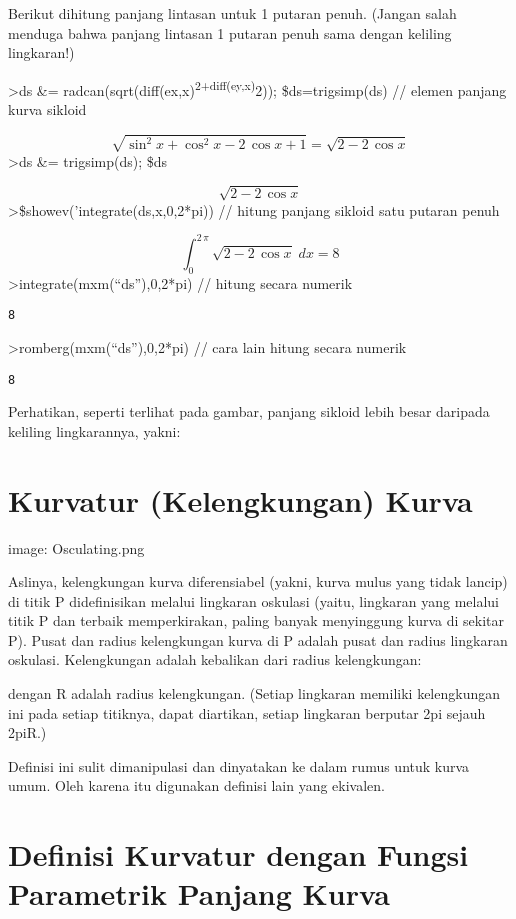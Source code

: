 \documentclass[
]{book}
\begin{document}
Berikut dihitung panjang lintasan untuk 1 putaran penuh. (Jangan salah menduga bahwa panjang lintasan 1 putaran penuh sama dengan keliling lingkaran!)

\textgreater ds \&= radcan(sqrt(diff(ex,x)\textsuperscript{2+diff(ey,x)}2)); \$ds=trigsimp(ds) // elemen panjang kurva sikloid

\[\sqrt{\sin ^2x+\cos ^2x-2\,\cos x+1}=\sqrt{2-2\,\cos x}\]\textgreater ds \&= trigsimp(ds); \$ds

\[\sqrt{2-2\,\cos x}\]\textgreater\$showev('integrate(ds,x,0,2*pi)) // hitung panjang sikloid satu putaran penuh

\[\int_{0}^{2\,\pi}{\sqrt{2-2\,\cos x}\;dx}=8\]\textgreater integrate(mxm(``ds''),0,2*pi) // hitung secara numerik

\begin{verbatim}
8
\end{verbatim}

\textgreater romberg(mxm(``ds''),0,2*pi) // cara lain hitung secara numerik

\begin{verbatim}
8
\end{verbatim}

Perhatikan, seperti terlihat pada gambar, panjang sikloid lebih besar daripada keliling lingkarannya, yakni:

\section{Kurvatur (Kelengkungan) Kurva}\label{kurvatur-kelengkungan-kurva}

image: Osculating.png

Aslinya, kelengkungan kurva diferensiabel (yakni, kurva mulus yang tidak lancip) di titik P didefinisikan melalui lingkaran oskulasi (yaitu, lingkaran yang melalui titik P dan terbaik memperkirakan, paling banyak menyinggung kurva di sekitar P). Pusat dan radius kelengkungan kurva di P adalah pusat dan radius lingkaran oskulasi. Kelengkungan adalah kebalikan dari radius kelengkungan:

dengan R adalah radius kelengkungan. (Setiap lingkaran memiliki kelengkungan ini pada setiap titiknya, dapat diartikan, setiap lingkaran berputar 2pi sejauh 2piR.)

Definisi ini sulit dimanipulasi dan dinyatakan ke dalam rumus untuk kurva umum. Oleh karena itu digunakan definisi lain yang ekivalen.

\section{Definisi Kurvatur dengan Fungsi Parametrik Panjang Kurva}\label{definisi-kurvatur-dengan-fungsi-parametrik-panjang-kurva}
\end{document}
